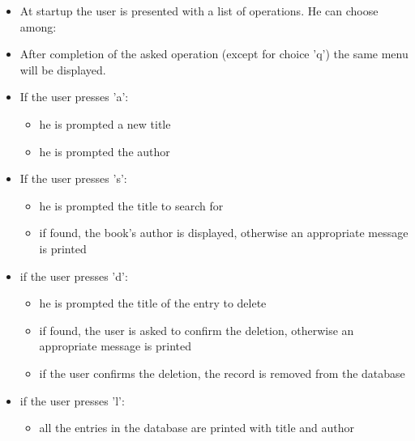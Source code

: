 \documentclass{exercices}
\renewcommand{\|}{\url|}
\begin{document}
\begin{itemize}
  \item At startup the user is presented with a list of operations. He can choose among:
    \begin{itemize}
    \end{itemize}
  \item After completion of the asked operation (except for choice 'q') the same menu will be displayed.
  \item If the user presses 'a':
    \begin{itemize}
    \item he is prompted a new title
    \item he is prompted the author
    \end{itemize}
  \item If the user presses 's':
    \begin{itemize}
      \item he is prompted the title to search for
      \item if found, the book's author is displayed, otherwise an appropriate message is printed
    \end{itemize}

  \item if the user presses 'd':
    \begin{itemize}        
      \item he is prompted the title of the entry to delete
      \item if found, the user is asked to confirm the deletion, otherwise an appropriate message is printed
      \item if the user confirms the deletion, the record is removed from the database
    \end{itemize}
  \item if the user presses 'l':
    \begin{itemize}
      \item all the entries in the database are printed with title and author
    \end{itemize}
\end{itemize}
\end{document}
